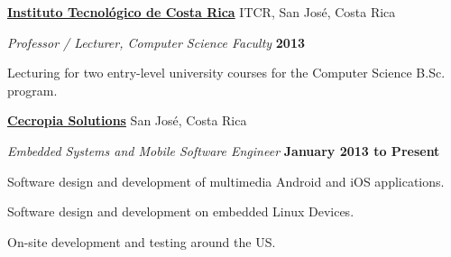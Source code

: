 \documentclass[10pt]{article}
\newenvironment{outerlist}[1][\enskip\textbullet]%
        {\begin{itemize}[#1]}{\end{itemize}%
         \vspace{-0.9\baselineskip}}
\newenvironment{innerlist}[1][\enskip\textbullet]%
        {\begin{compactitem}[#1]}{\end{compactitem}}
\begin{document}
\href{http://www.tec.cr/}{\textbf{Instituto Tecnol\'{o}gico de Costa Rica}} ITCR,
San Jos\'{e}, Costa Rica
\begin{outerlist}

	\item[] \textit{Professor / Lecturer, Computer Science Faculty}%
		\hfill \textbf{2013} 
			\begin{innerlist}
			\item Lecturing for two entry-level university courses for the Computer Science B.Sc. program.\\
			\end{innerlist}

\end{outerlist}

\href{http://www.cecropiasolutions.com/}{\textbf{Cecropia Solutions}}
San Jos\'{e}, Costa Rica
\begin{outerlist}

	\item[] \textit{Embedded Systems and Mobile Software Engineer}%
		\hfill \textbf{January 2013 to Present} 
			\begin{innerlist}
			\item Software design and development of multimedia Android and iOS applications.
			\item Software design and development on embedded Linux Devices.
			\item On-site development and testing around the US.\\
			\end{innerlist}

\end{outerlist}
\pagebreak
\end{document}
